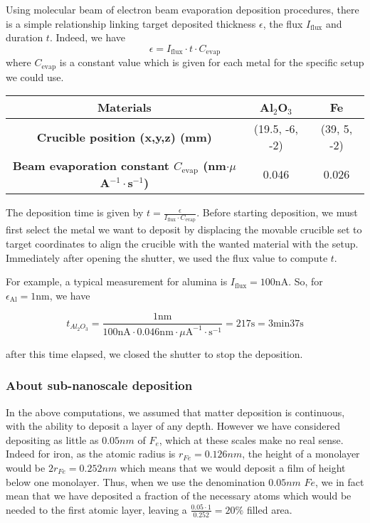 \documentclass[a4paper,12pt,twoside]{article}
\begin{document}
Using molecular beam of electron beam evaporation deposition procedures, there is a simple relationship linking target deposited thickness $\epsilon$, the flux $I_{\mathrm{flux}}$ and duration $t$. Indeed, we have
\[
    \epsilon = I_{\mathrm{flux}} \cdot t \cdot C_{\text{evap}}
\]
where $C_{\text{evap}}$ is a constant value which is given for each metal for the specific setup we could use.

\begin{table}[H]
\centering
\begin{tabular}{|c|c|c|}
    \hline
    \textbf{Materials} & Al$_2$O$_3$ & Fe \\
    \hline
    \textbf{Crucible position (x,y,z) (mm)}  & (19.5, -6, -2) & (39, 5, -2) \\
    \hline
    \textbf{Beam evaporation constant $C_{\mathrm{evap}}$ (nm$\cdot \mu$A$^{-1} \cdot$s$^{-1}$)}  & 0.046 & 0.026 \\
    \hline
\end{tabular}
\end{table}

The deposition time is given by $t = \frac{\epsilon}{I_{\mathrm{flux}} \cdot C_{\mathrm{evap}}}$. Before starting deposition, we must first select the metal we want to deposit by displacing the movable crucible set to target coordinates to align the crucible with the wanted material with the setup. Immediately after opening the shutter, we used the flux value to compute $t$.

For example, a typical measurement for alumina is $I_{\mathrm{flux}} = 100 \mathrm{nA}$. So, for $\epsilon_{\mathrm{Al}} =  1 \mathrm{nm}$, we have

$$t_{Al_2O_3} = \frac{1 \mathrm{nm}}{100 \mathrm{nA} \cdot 0.046 \mathrm{nm} \cdot \mu\mathrm{A}^{-1} \cdot \mathrm{s}^{-1}} = 217 \mathrm{s} = 3 \mathrm{min} 37 \mathrm{s}$$

after this time elapsed, we closed the shutter to stop the deposition.

\label{sec:about-sub-nano}
\subsubsection{About sub-nanoscale deposition}
In the above computations, we assumed that matter deposition is continuous, with the ability to deposit a layer of any depth. However we have considered depositing as little as $0.05 nm$ of $F_e$, which at these scales make no real sense. Indeed for iron, as the atomic radius is $r_{Fe} = 0.126 nm$, the height of a monolayer would be $2 r_{Fe} = 0.252 nm$ which means that we would deposit a film of height below one monolayer. Thus, when we use the denomination $0.05 nm$ $Fe$, we in fact mean that we have deposited a fraction of the necessary atoms which would be needed to the first atomic layer, leaving a $\frac{0.05\cdot1}{0.252} = 20 \%$ filled area.  
\end{document}
